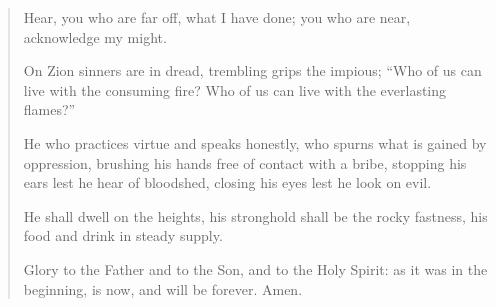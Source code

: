 \settowidth{\versewidth}{Who of us can live with the everlasting flames?”}
\begin{verse}%
  \begin{patverse}
Hear, you who are far off,
what I have done;
you who are near,
acknowledge my might.

On Zion sinners are in dread,
trembling grips the impious;
“Who of us can live with the consuming fire?
Who of us can live with the everlasting flames?”

He who practices virtue and speaks honestly,
who spurns what is gained by oppression,
brushing his hands
free of contact with a bribe,
stopping his ears lest he hear of bloodshed,
closing his eyes lest he look on evil.

He shall dwell on the heights,
his stronghold shall be the rocky fastness,
his food and drink
in steady supply.

Glory to the Father and to the Son,
and to the Holy Spirit:
as it was in the beginning, is now,
and will be forever. Amen. 
  \end{patverse}
\end{verse}
